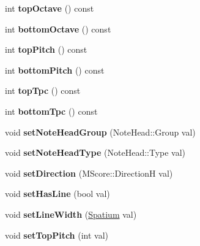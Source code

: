 \begin{DoxyCompactItemize}
int {\bfseries top\+Octave} () const
\item 
\mbox{\label{class_ms_1_1_ambitus_a948bf087e81bf4028bf2db96a256119e}} 
int {\bfseries bottom\+Octave} () const
\item 
\mbox{\label{class_ms_1_1_ambitus_a870e19335dd29d50b414f89e5582581d}} 
int {\bfseries top\+Pitch} () const
\item 
\mbox{\label{class_ms_1_1_ambitus_a11d52fc01e40ddbf46a7d0567f687723}} 
int {\bfseries bottom\+Pitch} () const
\item 
\mbox{\label{class_ms_1_1_ambitus_a68eee69416e3d153c059b3bf1d6ece93}} 
int {\bfseries top\+Tpc} () const
\item 
\mbox{\label{class_ms_1_1_ambitus_af94b1ffaf354e6e7f60297fdca891fd7}} 
int {\bfseries bottom\+Tpc} () const
\item 
\mbox{\label{class_ms_1_1_ambitus_ae8b37b9939a50b2217384355b8d1d6c7}} 
void {\bfseries set\+Note\+Head\+Group} (Note\+Head\+::\+Group val)
\item 
\mbox{\label{class_ms_1_1_ambitus_aa24e558f8f90c2db22a8eab1fe57e502}} 
void {\bfseries set\+Note\+Head\+Type} (Note\+Head\+::\+Type val)
\item 
\mbox{\label{class_ms_1_1_ambitus_a193aa15addc6341a125de2918005cd55}} 
void {\bfseries set\+Direction} (M\+Score\+::\+DirectionH val)
\item 
\mbox{\label{class_ms_1_1_ambitus_a556b61f84e3a82ac9f0d66eb2c589c27}} 
void {\bfseries set\+Has\+Line} (bool val)
\item 
\mbox{\label{class_ms_1_1_ambitus_a97fb099d6550e8977b25a942d0d49d7a}} 
void {\bfseries set\+Line\+Width} (\hyperlink{class_ms_1_1_spatium}{Spatium} val)
\item 
\mbox{\label{class_ms_1_1_ambitus_a1db062c35c8c13eac5fbca0ec9780e17}} 
void {\bfseries set\+Top\+Pitch} (int val)

\end{DoxyCompactItemize}
